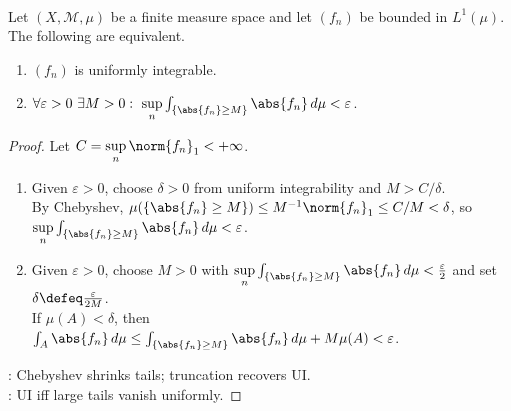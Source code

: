 \begin{proposition} \label{prop:uniform-integrability-large-value-tails} \\
Let $(X,\mathcal{M},\mu)$ be a finite measure space and let $(f_n)$ be bounded in $L^1(\mu)$. The following are equivalent.
\begin{enumerate}[label=(\roman*)]
\setlength{\itemsep}{0pt}
\item $(f_n)$ is uniformly integrable.
\item $\forall\varepsilon>0\ \exists M>0:\ \sup\limits_n\int_{\{\abs{f_n}\geq M\}}\abs{f_n}\,d\mu<\varepsilon$.
\end{enumerate}
\begin{proof}
Let $C=\sup\limits_n\norm{f_n}_1<+\infty$.
\begin{enumerate}[label=\roman*.]
\setlength{\itemsep}{0pt}
\item[$(\Rightarrow)$] Given $\varepsilon>0$, choose $\delta>0$ from uniform integrability and $M>C/\delta$.\\
By Chebyshev, $\mu(\{\abs{f_n}\geq M\})\leq M^{-1}\norm{f_n}_1\leq C/M<\delta$, so $\sup\limits_n\int_{\{\abs{f_n}\geq M\}}\abs{f_n}\,d\mu<\varepsilon$.
\item[$(\Leftarrow)$] Given $\varepsilon>0$, choose $M>0$ with $\sup\limits_n\int_{\{\abs{f_n}\geq M\}}\abs{f_n}\,d\mu<\frac{\varepsilon}{2}$ and set $\delta\defeq\frac{\varepsilon}{2M}$.\\
If $\mu(A)<\delta$, then $\int_A\abs{f_n}\,d\mu\leq\int_{\{\abs{f_n}\geq M\}}\abs{f_n}\,d\mu+M\mu(A)<\varepsilon$.
\end{enumerate}
: Chebyshev shrinks tails; truncation recovers UI.\\
: UI iff large tails vanish uniformly.
\end{proof}
\end{proposition}

